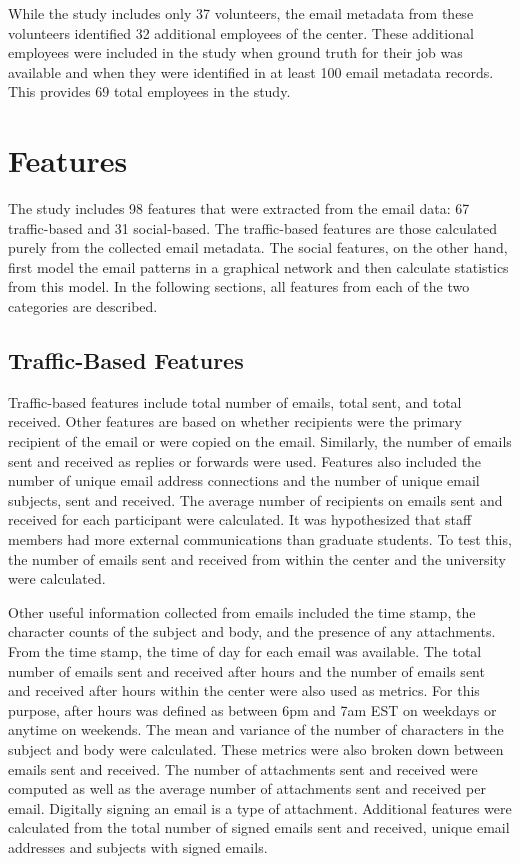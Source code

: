 \documentclass[10pt,twocolumn,conference]{IEEEtran}
\begin{document}
While the study includes only 37 volunteers, the email metadata from these volunteers identified 32 additional employees of the center.  These additional employees were included in the study when ground truth for their job was available and when they were identified in at least 100 email metadata records.  This provides 69 total employees in the study.


\section{Features} \label{Features}
The study includes 98 features that were extracted from the email data: 67 traffic-based and 31 social-based.  The traffic-based features are those calculated purely from the collected email metadata.  The social features, on the other hand, first model the email patterns in a graphical network and then calculate statistics from this model.  In the following sections, all features from each of the two categories are described. 

\subsection{Traffic-Based Features}
Traffic-based features include total number of emails, total sent, and total received.  Other features are based on whether recipients were the primary recipient of the email or were copied on the email.  Similarly, the number of emails sent and received as replies or forwards were used.  Features also included the number of unique email address connections and the number of unique email subjects, sent and received.  The average number of recipients on emails sent and received for each participant were calculated.  It was hypothesized that staff members had more external communications than graduate students.  To test this, the number of emails sent and received from within the center and the university were calculated.  

Other useful information collected from emails included the time stamp, the character counts of the subject and body, and the presence of any attachments. From the time stamp, the time of day for each email was available.  The total number of emails sent and received after hours and the number of emails sent and received after hours within the center were also used as metrics.  For this purpose, after hours was defined as between 6pm and 7am EST on weekdays or anytime on weekends.  The mean and variance of the number of characters in the subject and body were calculated.  These metrics were also broken down between emails sent and received.  The number of attachments sent and received were computed as well as the average number of attachments sent and received per email.  Digitally signing an email is a type of attachment.  Additional features were calculated from the total number of signed emails sent and received, unique email addresses and subjects with signed emails.
\end{document}
